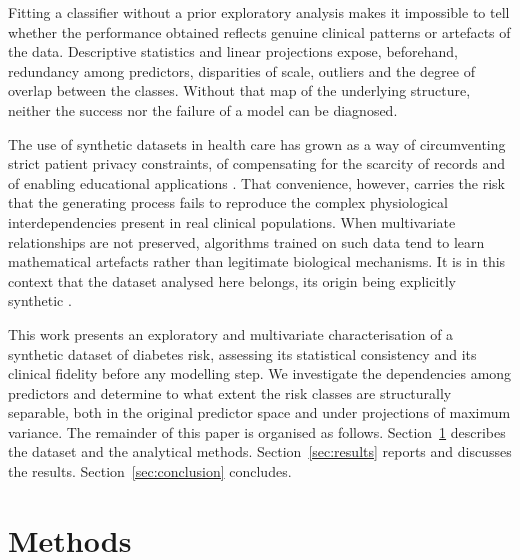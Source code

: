 \documentclass[conference]{IEEEtran}
\begin{document}
Fitting a classifier without a prior exploratory analysis makes it
impossible to tell whether the performance obtained reflects genuine
clinical patterns or artefacts of the data. Descriptive statistics and
linear projections expose, beforehand, redundancy among predictors,
disparities of scale, outliers and the degree of overlap between the
classes. Without that map of the underlying structure, neither the
success nor the failure of a model can be diagnosed.

The use of synthetic datasets in health care has grown as a way of
circumventing strict patient privacy constraints, of compensating for
the scarcity of records and of enabling educational applications
\cite{synthetic2021}. That convenience, however, carries the risk that
the generating process fails to reproduce the complex physiological
interdependencies present in real clinical populations. When
multivariate relationships are not preserved, algorithms trained on
such data tend to learn mathematical artefacts rather than legitimate
biological mechanisms. It is in this context that the dataset analysed
here belongs, its origin being explicitly synthetic \cite{kaggle2024}.

This work presents an exploratory and multivariate characterisation of
a synthetic dataset of diabetes risk, assessing its statistical
consistency and its clinical fidelity before any modelling step. We
investigate the dependencies among predictors and determine to what
extent the risk classes are structurally separable, both in the
original predictor space and under projections of maximum variance.
The remainder of this paper is organised as follows.
Section~\ref{sec:methods} describes the dataset and the analytical
methods. Section~\ref{sec:results} reports and discusses the results.
Section~\ref{sec:conclusion} concludes.

\section{Methods}
\label{sec:methods}
\end{document}
